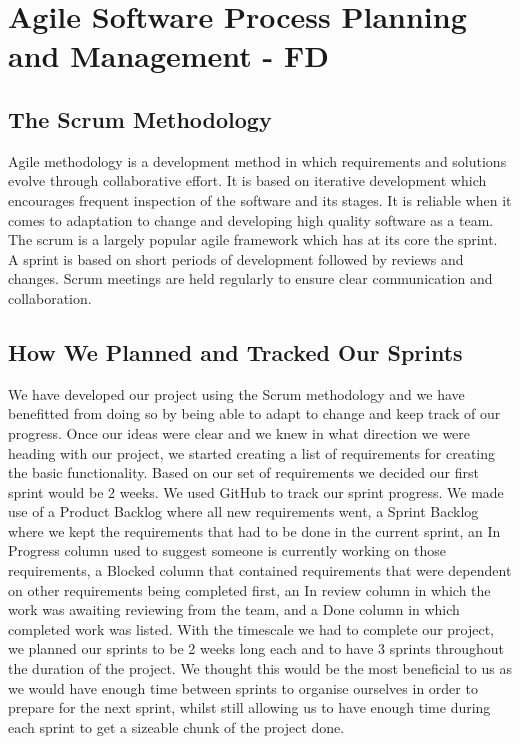 \documentclass[10pt, notitlepage]{report}
\begin{document}
\chapter{Agile Software Process Planning and Management - FD}

\section{The Scrum Methodology}

Agile methodology is a development method in which requirements and solutions evolve through collaborative effort. It is based on iterative development which encourages frequent inspection of the software and its stages. It is reliable when it comes to adaptation to change and developing high quality software as a team. The scrum is a largely popular agile framework which has at its core the sprint. A sprint is based on short periods of development followed by reviews and changes. Scrum meetings are held regularly to ensure clear communication and collaboration.

\section{How We Planned and Tracked Our Sprints}

We have developed our project using the Scrum methodology and we have benefitted from doing so by being able to adapt to change and keep track of our progress. Once our ideas were clear and we knew in what direction we were heading with our project, we started creating a list of requirements for creating the basic functionality. Based on our set of requirements we decided our first sprint would be 2 weeks. We used GitHub to track our sprint progress. We made use of a Product Backlog where all new requirements went, a Sprint Backlog where we kept the requirements that had to be done in the current sprint, an In Progress column used to suggest someone is currently working on those requirements, a Blocked column that contained requirements that were dependent on other requirements being completed first, an In review column in which the work was awaiting reviewing from the team, and a Done column in which completed work was listed.
With the timescale we had to complete our project, we planned our sprints to be 2 weeks long each and to have 3 sprints throughout the duration of the project. We thought this would be the most beneficial to us as we would have enough time between sprints to organise ourselves in order to prepare for the next sprint, whilst still allowing us to have enough time during each sprint to get a sizeable chunk of the project done. 
\end{document}
